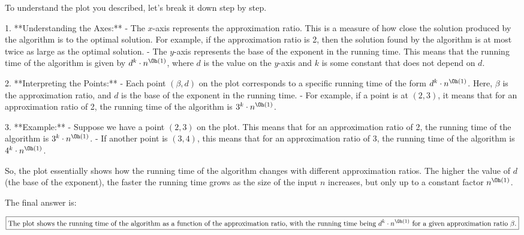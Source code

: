 To understand the plot you described, let's break it down step by step.

1. **Understanding the Axes:**
   - The \( x \)-axis represents the approximation ratio. This is a measure of how close the solution produced by the algorithm is to the optimal solution. For example, if the approximation ratio is 2, then the solution found by the algorithm is at most twice as large as the optimal solution.
   - The \( y \)-axis represents the base of the exponent in the running time. This means that the running time of the algorithm is given by \( d^k \cdot n^{\Oh(1)} \), where \( d \) is the value on the \( y \)-axis and \( k \) is some constant that does not depend on \( d \).

2. **Interpreting the Points:**
   - Each point \((\beta, d)\) on the plot corresponds to a specific running time of the form \( d^k \cdot n^{\Oh(1)} \). Here, \(\beta\) is the approximation ratio, and \( d \) is the base of the exponent in the running time.
   - For example, if a point is at \((2, 3)\), it means that for an approximation ratio of 2, the running time of the algorithm is \( 3^k \cdot n^{\Oh(1)} \).

3. **Example:**
   - Suppose we have a point \((2, 3)\) on the plot. This means that for an approximation ratio of 2, the running time of the algorithm is \( 3^k \cdot n^{\Oh(1)} \).
   - If another point is \((3, 4)\), this means that for an approximation ratio of 3, the running time of the algorithm is \( 4^k \cdot n^{\Oh(1)} \).

So, the plot essentially shows how the running time of the algorithm changes with different approximation ratios. The higher the value of \( d \) (the base of the exponent), the faster the running time grows as the size of the input \( n \) increases, but only up to a constant factor \( n^{\Oh(1)} \).

The final answer is:

\[
\boxed{\text{The plot shows the running time of the algorithm as a function of the approximation ratio, with the running time being } d^k \cdot n^{\Oh(1)} \text{ for a given approximation ratio } \beta.}
\]